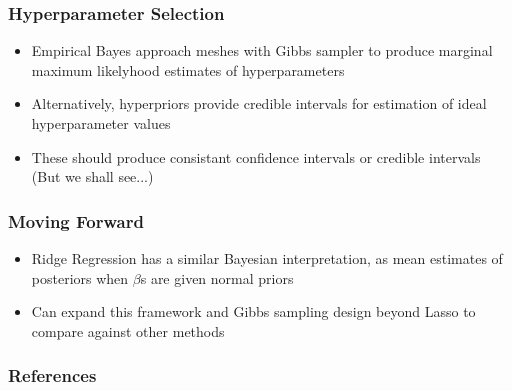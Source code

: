\documentclass{beamer} %
\theoremstyle{definition}
\begin{document}
\begin{frame}
\frametitle{Hyperparameter Selection}
\begin{itemize}
\item Empirical Bayes approach meshes with Gibbs sampler to produce marginal maximum likelyhood estimates of hyperparameters
\item Alternatively, hyperpriors provide credible intervals for estimation of ideal hyperparameter values
\item These should produce consistant confidence intervals or credible intervals (But we shall see...)
\end{itemize}
\end{frame}

\begin{frame}
\frametitle{Moving Forward}
\begin{itemize}
\item Ridge Regression has a similar Bayesian interpretation, as mean estimates of posteriors when $\beta$s are given normal priors
\item Can expand this framework and Gibbs sampling design beyond Lasso to compare against other methods
\end{itemize}
\end{frame}

\begin{frame}
\frametitle{References}


\nocite{*}
\end{frame}
\end{document}
